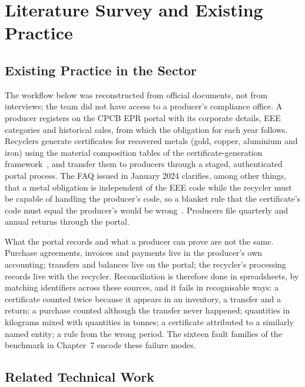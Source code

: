 \chapter{Literature Survey and Existing Practice}

\section{Existing Practice in the Sector}
The workflow below was reconstructed from official documents, not from interviews; the team did
not have access to a producer's compliance office. A producer registers on the CPCB EPR portal
with its corporate details, EEE categories and historical sales, from which the obligation
for each year follows. Recyclers generate certificates for recovered metals (gold,
copper, aluminium and iron) using the material composition tables of the certificate-generation
framework~\cite{framework}, and transfer them to producers through a staged, authenticated portal
process. The FAQ issued in January 2024 clarifies, among other things, that a metal obligation is
independent of the EEE code while the recycler must be capable of handling the producer's code,
so a blanket rule that the certificate's code must equal the producer's would be
wrong~\cite{faq2024}. Producers file quarterly and annual returns through the portal.

What the portal records and what a producer can prove are not the same. Purchase agreements,
invoices and payments live in the producer's own accounting; transfers and balances live on the
portal; the recycler's processing records live with the recycler. Reconciliation is therefore done
in spreadsheets, by matching identifiers across these sources, and it fails in recognisable ways:
a certificate counted twice because it appears in an inventory, a transfer and a return; a
purchase counted although the transfer never happened; quantities in kilograms mixed with
quantities in tonnes; a certificate attributed to a similarly named entity; a rule from the wrong
period. The sixteen fault families of the benchmark in Chapter~7 encode these failure modes.

\section{Related Technical Work}

